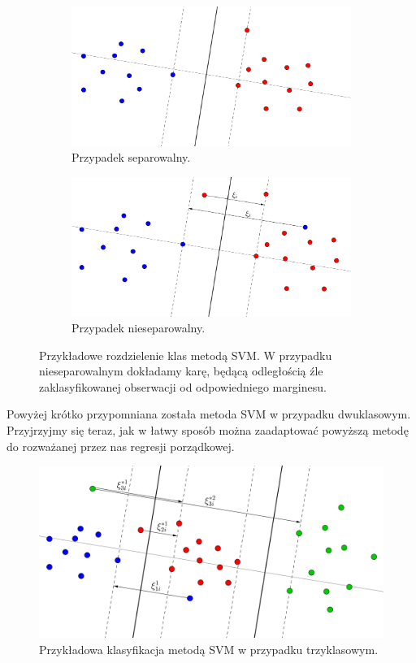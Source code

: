 \documentclass{mini}
\begin{document}
\begin{figure}[!hb]
  \begin{subfigure}[]{\textwidth}
    \includegraphics[width=\textwidth]{graphics/svm1.png}
    \caption{Przypadek separowalny.}
  \end{subfigure}
  \begin{subfigure}[]{\textwidth}
    \includegraphics[width=\textwidth]{graphics/svm1eps.png}
    \caption{Przypadek nieseparowalny.}
  \end{subfigure}
  \caption{Przykładowe rozdzielenie klas metodą SVM. W przypadku nieseparowalnym dokładamy karę, będącą odległością źle zaklasyfikowanej obserwacji od odpowiedniego marginesu.}
  \label{svm1}
\end{figure}

Powyżej krótko przypomniana została metoda SVM w przypadku dwuklasowym. Przyjrzyjmy się teraz, jak w łatwy sposób można zaadaptować powyższą metodę do rozważanej przez nas regresji porządkowej.

\begin{figure}[!h]
\begin{center}
\includegraphics[width=\textwidth]{graphics/svm3.png}
\end{center}
\caption{Przykładowa klasyfikacja metodą SVM w przypadku trzyklasowym.}
\label{svm}
\end{figure}
\end{document}
